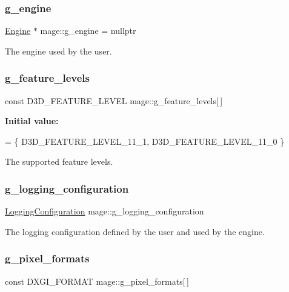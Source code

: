 \subsubsection{\texorpdfstring{g\+\_\+engine}{g\_engine}}
{\footnotesize\ttfamily \hyperlink{classmage_1_1_engine}{Engine} $\ast$ mage\+::g\+\_\+engine = nullptr}

The engine used by the user. \hypertarget{namespacemage_add3b7e051df553262371e077d9d66fd9}{}\label{namespacemage_add3b7e051df553262371e077d9d66fd9} 
\subsubsection{\texorpdfstring{g\+\_\+feature\+\_\+levels}{g\_feature\_levels}}
{\footnotesize\ttfamily const D3\+D\+\_\+\+F\+E\+A\+T\+U\+R\+E\+\_\+\+L\+E\+V\+EL mage\+::g\+\_\+feature\+\_\+levels\mbox{[}$\,$\mbox{]}}

{\bfseries Initial value\+:}
\begin{DoxyCode}
= \{
        D3D\_FEATURE\_LEVEL\_11\_1,
        D3D\_FEATURE\_LEVEL\_11\_0
    \}
\end{DoxyCode}
The supported feature levels. \hypertarget{namespacemage_a162413669f92d91c7ee135d60f93fcf1}{}\label{namespacemage_a162413669f92d91c7ee135d60f93fcf1} 
\subsubsection{\texorpdfstring{g\+\_\+logging\+\_\+configuration}{g\_logging\_configuration}}
{\footnotesize\ttfamily \hyperlink{structmage_1_1_logging_configuration}{Logging\+Configuration} mage\+::g\+\_\+logging\+\_\+configuration}

The logging configuration defined by the user and used by the engine. \hypertarget{namespacemage_a5a4e11b65061c618b85826ab6df480e0}{}\label{namespacemage_a5a4e11b65061c618b85826ab6df480e0} 
\subsubsection{\texorpdfstring{g\+\_\+pixel\+\_\+formats}{g\_pixel\_formats}}
{\footnotesize\ttfamily const D\+X\+G\+I\+\_\+\+F\+O\+R\+M\+AT mage\+::g\+\_\+pixel\+\_\+formats\mbox{[}$\,$\mbox{]}}

